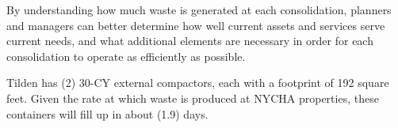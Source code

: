 
    By understanding how much waste is generated at each consolidation, planners and managers
    can better determine how well current assets and services serve current needs, and what additional 
    elements are necessary in order for each consolidation to operate as efficiently as possible. 

    Tilden has (2) 30-CY external compactors, each with a footprint of 192 square feet. Given the rate at which waste is produced at NYCHA properties, these containers will fill
    up in about (1.9) days.